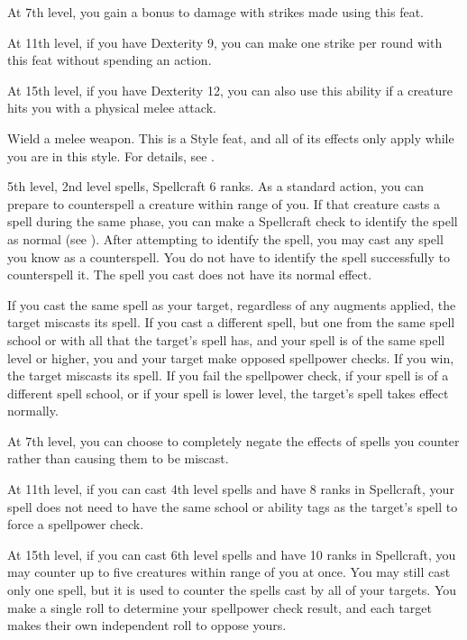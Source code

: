     At 7th level, you gain a  bonus to damage with strikes made using this feat.

    At 11th level, if you have Dexterity 9, you can make one strike per round with this feat without spending an action.

    At 15th level, if you have Dexterity 12, you can also use this ability if a creature hits you with a physical melee attack.

    \stylereq Wield a melee weapon.
     This is a Style feat, and all of its effects only apply while you are in this style.
    For details, see .

    \featpres 5th level, 2nd level spells, Spellcraft 6 ranks.
    \featben As a standard action, you can prepare to counterspell a creature within \rngmed range of you.
    If that creature casts a spell during the same phase, you can make a Spellcraft check to identify the spell as normal (see ).
    After attempting to identify the spell, you may cast any spell you know as a counterspell.
    You do not have to identify the spell successfully to counterspell it.
    The spell you cast does not have its normal effect.

    If you cast the same spell as your target, regardless of any augments applied, the target miscasts its spell.
    If you cast a different spell, but one from the same spell school or with all  that the target's spell has, and your spell is of the same spell level or higher, you and your target make opposed spellpower checks.
    If you win, the target miscasts its spell.
    If you fail the spellpower check, if your spell is of a different spell school, or if your spell is lower level, the target's spell takes effect normally.

    At 7th level, you can choose to completely negate the effects of spells you counter rather than causing them to be miscast.

    At 11th level, if you can cast 4th level spells and have 8 ranks in Spellcraft, your spell does not need to have the same school or ability tags as the target's spell to force a spellpower check.

    At 15th level, if you can cast 6th level spells and have 10 ranks in Spellcraft, you may counter up to five creatures within \rngmed range of you at once.
    You may still cast only one spell, but it is used to counter the spells cast by all of your targets.
    You make a single roll to determine your spellpower check result, and each target makes their own independent roll to oppose yours.

